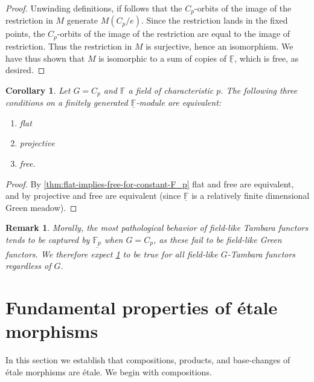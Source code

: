 \documentclass[11pt,dvipsnames]{amsart}
\newcommand{\F}{\mathbb{F}}
\newtheorem{corollary}[theorem]{Corollary}
\theoremstyle{BoldRemark}
\newtheorem{remark}[theorem]{Remark}
\begin{document}
\begin{proof}
    Unwinding definitions, if follows that the $C_p$-orbits of the image of the restriction in $M$ generate $M(C_p/e)$. Since the restriction lands in the fixed points, the $C_p$-orbits of the image of the restriction are equal to the image of restriction. Thus the restriction in $M$ is surjective, hence an isomorphism. We have thus shown that $M$ is isomorphic to a sum of copies of $\underline{\F}$, which is free, as desired.
\end{proof}

\begin{corollary}\label{cor:flat-proj-and-free-are-equiv-for-constant-F_p}
    Let $G = C_p$ and $\F$ a field of characteristic $p$. The following three conditions on a finitely generated $\underline{\F}$-module are equivalent:
    \begin{enumerate}
        \item flat
        \item projective
        \item free.
    \end{enumerate}
\end{corollary}

\begin{proof}
    By \cref{thm:flat-implies-free-for-constant-F_p} flat and free are equivalent, and by \cite[Theorem 4.7]{CW25} projective and free are equivalent (since $\underline{\F}$ is a relatively finite dimensional Green meadow).
\end{proof}

\begin{remark}
    Morally, the most pathological behavior of field-like Tambara functors tends to be captured by $\underline{\F_p}$ when $G = C_p$, as these fail to be field-like Green functors. We therefore expect \cref{cor:flat-proj-and-free-are-equiv-for-constant-F_p} to be true for all field-like $G$-Tambara functors regardless of $G$.
\end{remark}

\section{Fundamental properties of \'{e}tale morphisms}

In this section we establish that compositions, products, and base-changes of \'{e}tale morphisms are \'{e}tale. We begin with compositions.
\end{document}
